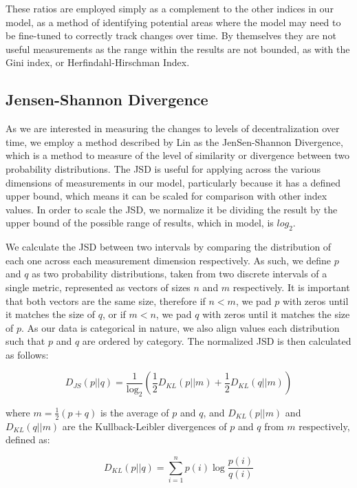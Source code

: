 \documentclass[conference]{IEEEtran}
\begin{document}
These ratios are employed simply as a complement to the other indices in our model, as a method of identifying potential areas where the model may need to be fine-tuned to correctly track changes over time.  By themselves they are not useful measurements as the range within the results are not bounded, as with the Gini index, or Herfindahl-Hirschman Index.

\subsection{Jensen-Shannon Divergence}

As we are interested in measuring the changes to levels of decentralization over time,  we employ a method described by Lin \cite{lin1991divergence} as the JenSen-Shannon Divergence, which is a method to measure of the level of similarity or divergence between two probability distributions.  The JSD is useful for applying across the various dimensions of measurements in our model, particularly because it has a defined upper bound, which means it can be scaled for comparison with other index values.  In order to scale the JSD, we normalize it be dividing the result by the upper bound of the possible range of results, which in model, is $log_2$.

We calculate the JSD between two intervals by comparing the distribution of each one across each measurement dimension respectively.  As such, we define $p$ and $q$  as two probability distributions, taken from two discrete intervals of a single metric, represented as vectors of sizes $n$ and $m$ respectively. It is important that both vectors are the same size, therefore if $n < m$,  we pad $p$ with zeros until it matches the size of $q$, or if $m < n$, we pad $q$ with zeros until it matches the size of $p$.  As our data is categorical in nature, we also align values each distribution such that $p$ and $q$ are ordered by category.  The normalized JSD is then calculated as follows:


\[ D_{JS}(p||q) = \frac{1}{\log_2} \left( \frac{1}{2} D_{KL}(p||m) + \frac{1}{2} D_{KL}(q||m) \right) \]

\vspace{8pt}

where $m = \frac{1}{2} (p + q)$  is the average of $p$ and $q$, and $D_{KL}(p||m)$ and $D_{KL}(q||m)$ are the Kullback-Leibler divergences of $p$ and $q$  from $m$ respectively, defined as:

\[
D_{KL}(p||q) = \sum_{i=1}^{n} p(i) \log \frac{p(i)}{q(i)}
\]
\end{document}
